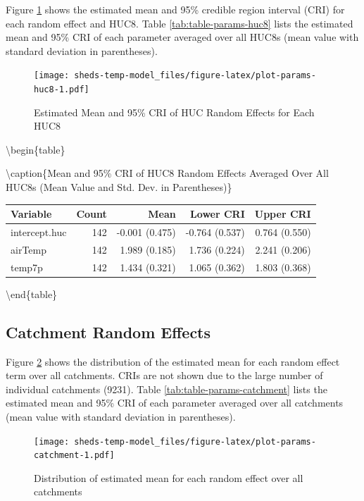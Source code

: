 \documentclass[]{book}
\begin{document}
Figure \ref{fig:plot-params-huc8} shows the estimated mean and 95\% credible region interval (CRI) for each random effect and HUC8. Table \ref{tab:table-params-huc8} lists the estimated mean and 95\% CRI of each parameter averaged over all HUC8s (mean value with standard deviation in parentheses).

\begin{figure}
\centering
\texttt{[image: sheds-temp-model\_files/figure-latex/plot-params-huc8-1.pdf]}
\caption{\label{fig:plot-params-huc8}Estimated Mean and 95\% CRI of HUC Random Effects for Each HUC8}
\end{figure}

\textbackslash{}begin\{table\}

\textbackslash{}caption\{\label{tab:table-params-huc8}Mean and 95\% CRI of HUC8 Random Effects Averaged Over All HUC8s (Mean Value and Std. Dev. in Parentheses)\}
\centering

\begin{tabular}[t]{l|r|r|r|r}
\hline
Variable & Count & Mean & Lower CRI & Upper CRI\\
\hline
intercept.huc & 142 & -0.001 (0.475) & -0.764 (0.537) & 0.764 (0.550)\\
\hline
airTemp & 142 & 1.989 (0.185) & 1.736 (0.224) & 2.241 (0.206)\\
\hline
temp7p & 142 & 1.434 (0.321) & 1.065 (0.362) & 1.803 (0.368)\\
\hline
\end{tabular}

\textbackslash{}end\{table\}

\hypertarget{catchment-random-effects-1}{%
\subsection{Catchment Random Effects}\label{catchment-random-effects-1}}

Figure \ref{fig:plot-params-catchment} shows the distribution of the estimated mean for each random effect term over all catchments. CRIs are not shown due to the large number of individual catchments (9231). Table \ref{tab:table-params-catchment} lists the estimated mean and 95\% CRI of each parameter averaged over all catchments (mean value with standard deviation in parentheses).

\begin{figure}
\centering
\texttt{[image: sheds-temp-model\_files/figure-latex/plot-params-catchment-1.pdf]}
\caption{\label{fig:plot-params-catchment}Distribution of estimated mean for each random effect over all catchments}
\end{figure}
\end{document}
